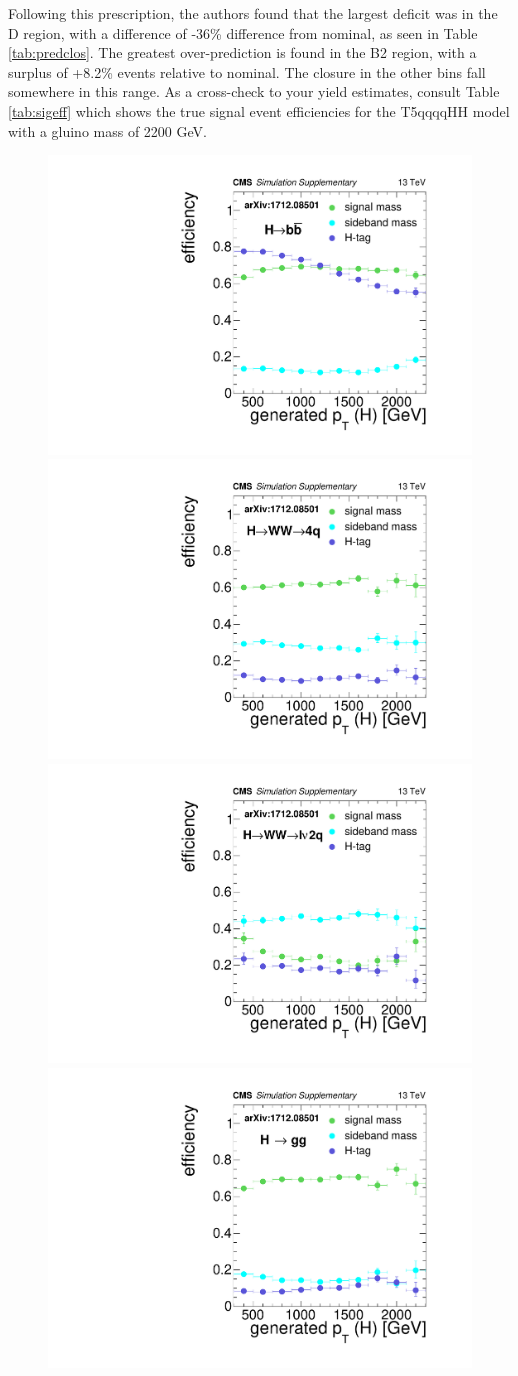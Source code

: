 Following this prescription, the authors found that the largest deficit was in the D region, with a difference of -36\% difference from nominal, as seen in Table \ref{tab:predclos}.
The greatest over-prediction is found in the B2 region, with a surplus of +8.2\% events relative to nominal.
The closure in the other bins fall somewhere in this range.
As a cross-check to your yield estimates, consult Table \ref{tab:sigeff} which shows the true signal event efficiencies for the T5qqqqHH model with a gluino mass of 2200 GeV.

\clearpage

\begin{figure}
\centering
\includegraphics[width=0.45\linewidth]{figs/SUS17006/CMS-SUS-17-006_Figure-aux_006.pdf}
\includegraphics[width=0.45\linewidth]{figs/SUS17006/CMS-SUS-17-006_Figure-aux_007.pdf}\\
\includegraphics[width=0.45\linewidth]{figs/SUS17006/CMS-SUS-17-006_Figure-aux_008.pdf}
\includegraphics[width=0.45\linewidth]{figs/SUS17006/CMS-SUS-17-006_Figure-aux_009.pdf}

\end{figure}
